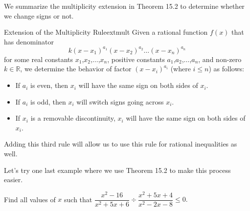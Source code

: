 \documentclass[lang=en,11pt]{elegantbook}
\begin{document}
We summarize the multiplicity extension in Theorem 15.2 to determine whether we change signs or not.
\begin{theorem}{Extension of the Multiplicity Rule}{extmult}
Given a rational function $f(x)$ that has denominator $$k(x-x_1)^{a_1}(x-x_2)^{a_2}\ldots(x-x_n)^{a_n}$$ for some real constants $x_1$,$x_2$,$\ldots$,$x_n$, positive constants $a_1$,$a_2$,$\ldots$,$a_n$, and non-zero $k\in\mathbb{R}$, we determine the behavior of factor $(x-x_i)^{a_i}$ (where $i\leq n$) as follows: \begin{itemize}
    \item If $a_i$ is even, then $x_i$ will have the same sign on both sides of $x_i$.
    \item If $a_i$ is odd, then $x_i$ will switch signs going across $x_i$.
    \item If $x_i$ is a removable discontinuity, $x_i$ will have the same sign on both sides of $x_i$.
\end{itemize}
Adding this third rule will allow us to use this rule for rational inequalities as well.
\end{theorem}
Let's try one last example where we use Theorem 15.2 to make this process easier.
\begin{example}
Find all values of $x$ such that $\dfrac{x^2-16}{x^2+5x+6} \div \dfrac{x^2+5x+4}{x^2-2x-8} \leq 0.$
\end{example}
\end{document}

